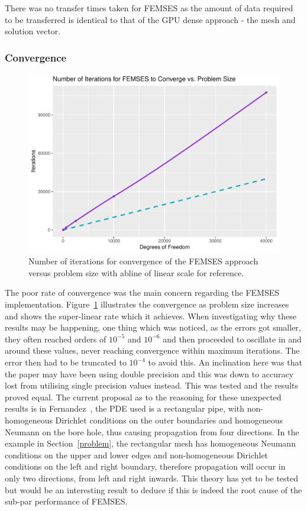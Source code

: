 There was no transfer times taken for FEMSES as the amount of data required to be transferred is identical to that of the GPU dense approach - the mesh and solution vector.
  
\subsubsection{Convergence}

\begin{figure}
	\centering
	\includegraphics[width=0.58\linewidth]{Plots/iters_v_n}
	\caption{Number of iterations for convergence of the FEMSES approach versus problem size with abline of linear scale for reference.}
	\label{fig:converg}
\end{figure}
The poor rate of convergence was the main concern regarding the FEMSES implementation. Figure~\ref{fig:converg} illustrates the convergence as problem size increases and shows the super-linear rate which it achieves. When investigating why these results may be happening, one thing which was noticed, as the errors got smaller, they often reached orders of $10^{-5}$ and $10^{-6}$ and then proceeded to oscillate in and around these values, never reaching convergence within maximum iterations. The error then had to be truncated to $10^{-4}$ to avoid this. An inclination here was that the paper may have been using double precision and this was down to accuracy lost from utilising single precision values instead. This was tested and the results proved equal. The current proposal as to the reasoning for these unexpected results is in Fernandez~\cite{femses}, the PDE used is a rectangular pipe, with non-homogeneous Dirichlet conditions on the outer boundaries and homogeneous Neumann on the bore hole, thus causing propagation from four directions. In the example in Section~\ref{problem}, the rectangular mesh has homogeneous Neumann conditions on the upper and lower edges and non-homogeneous Dirichlet conditions on the left and right boundary, therefore propagation will occur in only two directions, from left and right inwards. This theory has yet to be tested but would be an interesting result to deduce if this is indeed the root cause of the sub-par performance of FEMSES. 

